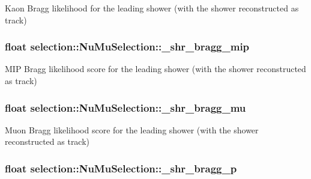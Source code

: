 Kaon Bragg likelihood for the leading shower (with the shower reconstructed as track) \hypertarget{classselection_1_1NuMuSelection_a418742070b70e6cd789a9dce1572c918}{
\subsubsection[{\-\_\-shr\-\_\-bragg\-\_\-mip}]{\setlength{\rightskip}{0pt plus 5cm}float selection\-::\-Nu\-Mu\-Selection\-::\-\_\-shr\-\_\-bragg\-\_\-mip\hspace{0.3cm}{\ttfamily [private]}}}\label{classselection_1_1NuMuSelection_a418742070b70e6cd789a9dce1572c918}
M\-I\-P Bragg likelihood score for the leading shower (with the shower reconstructed as track) \hypertarget{classselection_1_1NuMuSelection_aea36ed7e354b16fc1e5ff97cedb23c47}{
\subsubsection[{\-\_\-shr\-\_\-bragg\-\_\-mu}]{\setlength{\rightskip}{0pt plus 5cm}float selection\-::\-Nu\-Mu\-Selection\-::\-\_\-shr\-\_\-bragg\-\_\-mu\hspace{0.3cm}{\ttfamily [private]}}}\label{classselection_1_1NuMuSelection_aea36ed7e354b16fc1e5ff97cedb23c47}
Muon Bragg likelihood score for the leading shower (with the shower reconstructed as track) \hypertarget{classselection_1_1NuMuSelection_af7b55d564aef645da1ff8a1fa0b4e620}{
\subsubsection[{\-\_\-shr\-\_\-bragg\-\_\-p}]{\setlength{\rightskip}{0pt plus 5cm}float selection\-::\-Nu\-Mu\-Selection\-::\-\_\-shr\-\_\-bragg\-\_\-p\hspace{0.3cm}{\ttfamily [private]}}}\label{classselection_1_1NuMuSelection_af7b55d564aef645da1ff8a1fa0b4e620}
